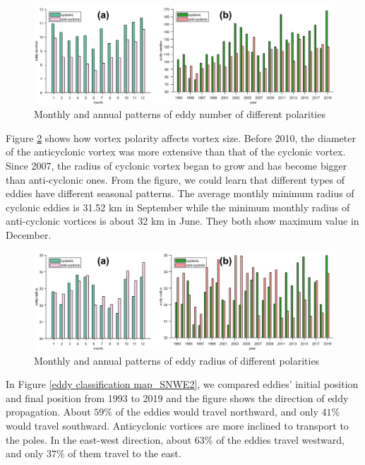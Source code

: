 \begin{figure}
    \centering
    \includegraphics[width = 15cm]{chapter/figure/eddy number vs Polarity.png}
    \caption{Monthly and annual patterns of eddy number of different polarities}
    \label{eddy number vs Polarity}
\end{figure}

Figure \ref{eddy radius vs type} shows how vortex polarity affects vortex size. Before 2010, the diameter of the anticyclonic vortex was more extensive than that of the cyclonic vortex. Since 2007, the radius of cyclonic vortex began to grow and has become bigger than anti-cyclonic ones. From the figure, we could learn that different types of eddies have different seasonal patterns. The average monthly minimum radius of cyclonic eddies is 31.52 km in September while the minimum monthly radius of anti-cyclonic vortices is about 32 km in June. They both show maximum value in December.

\begin{figure}
    \centering
    \includegraphics[width = 15cm]{chapter/figure/eddy radius vs type.png}
    \caption{Monthly and annual patterns of eddy radius of different polarities}
    \label{eddy radius vs type}
\end{figure}

In Figure \ref{eddy classification map_SNWE2}, we compared eddies' initial position and final position from 1993 to 2019 and the figure shows the direction of eddy propagation. About $59\%$ of the eddies would travel northward, and only $41\%$ would travel southward. Anticyclonic vortices are more inclined to transport to the poles. In the east-west direction, about $63\%$ of the eddies travel westward, and only $37\%$ of them travel to the east.


